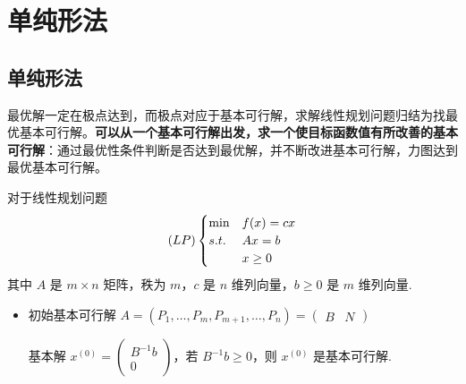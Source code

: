 \section{单纯形法}
\subsection{单纯形法}
\begin{note}
    最优解一定在极点达到，而极点对应于基本可行解，求解线性规划问题归结为找最优基本可行解。\textbf{可以从一个基本可行解出发，求一个使目标函数值有所改善的基本可行解}：通过最优性条件判断是否达到最优解，并不断改进基本可行解，力图达到最优基本可行解。
\end{note}

\begin{note}
    对于线性规划问题
    \[
        (LP)\begin{cases}
            \min & f(x)=cx \\
            s.t. & Ax=b \\
            & x \ge 0
        \end{cases}
    \]
    其中 $A$ 是 $m \times n$ 矩阵，秩为 $m$，$c$ 是 $n$ 维列向量，$b\ge 0$ 是 $m$ 维列向量.
    \begin{itemize}
        \item 初始基本可行解
            $A = (P_1, \dots, P_m, P_{m + 1}, \dots, P_n) = \begin{pmatrix}
                B & N
            \end{pmatrix}$

            基本解 $x^{(0)} = \begin{pmatrix}
                B^{-1}b \\
                0
            \end{pmatrix}$，若 $B^{-1}b \ge 0$，则 $x^{(0)}$ 是基本可行解.


\end{itemize}
\end{note}
